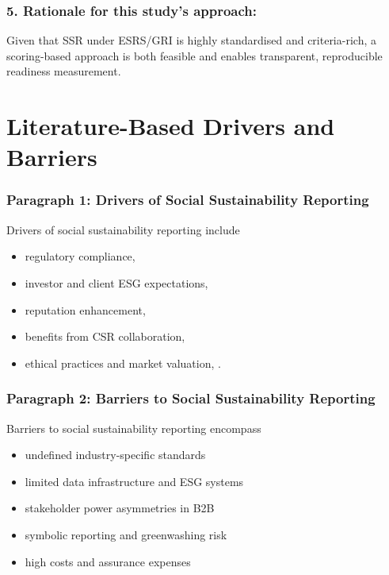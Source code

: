 \subsubsection{5. Rationale for this study's approach:}
Given that SSR under ESRS/GRI is highly standardised and criteria-rich, 
a scoring-based approach is both feasible and enables transparent, reproducible readiness measurement.

\section{Literature-Based Drivers and Barriers}

\subsubsection{Paragraph 1: Drivers of Social Sustainability Reporting}
Drivers of social sustainability reporting include 
\begin{itemize}
    \item regulatory compliance, \parencite{Reitmaier2024,Bochkay2025}
    \item investor and client ESG expectations, \parencite{Bonnefon2025,Dai2021}
    \item reputation enhancement, \parencite{Reitmaier2024}
    \item benefits from CSR collaboration, \parencite{Dai2021}
    \item ethical practices and market valuation, \parencite{Chouaibi2021}.
\end{itemize}

\subsubsection{Paragraph 2: Barriers to Social Sustainability Reporting}
Barriers to social sustainability reporting encompass 
\begin{itemize}
    \item undefined industry-specific standards \parencite{Bochkay2025}
    \item limited data infrastructure and ESG systems \parencite{Troshani2024,ElBaz2022,Jona2023,Belal2015}
    \item stakeholder power asymmetries in B2B \parencite{Dai2021}
    \item symbolic reporting and greenwashing risk \parencite{Reitmaier2024,Belal2015}
    \item high costs and assurance expenses \parencite{Dai2021,Najjar2023}
\end{itemize}
